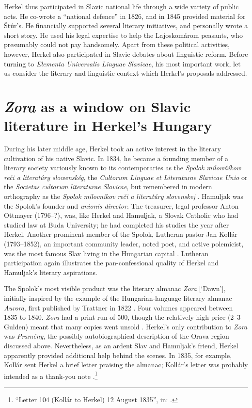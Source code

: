 Herkel thus participated in Slavic national life through a wide variety of public acts. He co-wrote a “national defence” in 1826, and in 1845 provided material for Štúr’s. He financially supported several literary initiatives, and personally wrote a short story. He used his legal expertise to help the Lajoskomárom peasants, who presumably could not pay handsomely. Apart from these political activities, however, Herkel also participated in Slavic debates about linguistic reform. Before turning to \textit{Elementa Universalis Linguae Slavicae}, his most important work, let us consider the literary and linguistic context which Herkel’s proposals addressed.

\section{\textit{Zora} as a window on Slavic literature in Herkel’s Hungary}

During his later middle age, Herkel took an active interest in the literary cultivation of his native Slavic. In 1834, he became a founding member of a literary society variously known to its contemporaries as the \textit{Spolok milowňíkow reči a literatúry slowenskég}, the \textit{Cultorum Linguae et Literaturae Slavicae Unio} or the \textit{Societas cultorum literaturae Slavicae}, but remembered in modern orthography as the \textit{Spolok milovníkov reči a literatúry slovenskej} \citep[209]{urhegyi_almanach_1984}. Hamuljak was the Spolok’s founder and \textit{unionis director}. The treasurer, legal professor Anton Ottmayer (1796--?), was, like Herkel and Hamuljak, a Slovak Catholic who had studied law at Buda University; he had completed his studies the year after Herkel. Another prominent member of the Spolok, Lutheran pastor Jan Kollár (1793--1852), an important community leader, noted poet, and active polemicist, was the most famous Slav living in the Hungarian capital \citep[68--79]{kacirek_community_2016}. Lutheran participation again illustrates the pan-confessional quality of Herkel and Hamuljak’s literary aspirations.

The Spolok’s most visible product was the literary almanac \textit{Zora} [‘Dawn’], initially inspired by the example of the Hungarian-language literary almanac \textit{Aurora}, first published by Trattner in 1822 \citep{kisfaludy_aurora_1822}. Four volumes appeared between 1835 to 1840. \textit{Zora} had a print run of 500, though the relatively high price (2--3 Gulden) meant that many copies went unsold \citep[212, 226--227]{urhegyi_almanach_1984}. Herkel’s only contribution to \textit{Zora} was \textit{Pramény}, the possibly autobiographical description of the Orava region discussed above. Nevertheless, as an ardent Slav and Hamuljak’s friend, Herkel apparently provided additional help behind the scenes. In 1835, for example, Kollár sent Herkel a brief letter praising the almanac; Kollár’s letter was probably intended as a thank-you note \citep[144]{ambrus_listy_1991}.\footnote{“Letter 104 (Kollár to Herkel) 12 August 1835”, in: \citet[144]{ambrus_listy_1991}.}

